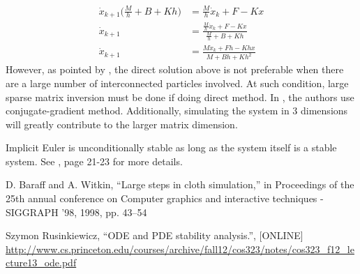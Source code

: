 \documentclass[english, 11pt]{article}
\begin{document}
\begin{equation}
  \begin{split}
    \dot{x}_{k+1} \bigg( \frac{M}{h}+B+Kh \bigg) &= \frac{M}{h}\dot{x}_{k}+F-Kx \\
    \dot{x}_{k+1} &= \frac{\frac{M}{h}\dot{x}_{k}+F-Kx }{\frac{M}{h}+B+Kh} \\
    \dot{x}_{k+1} &= \frac{M\dot{x}_{k}+Fh-Khx}{M+Bh+Kh^2}
  \end{split}  
\end{equation}	
However, as pointed by \cite{Baraff}, the direct solution above is not preferable when there are a large number of interconnected particles involved. At such condition, large sparse matrix inversion must be done if doing direct method. In \cite{Baraff}, the authors use conjugate-gradient method. Additionally, simulating the system in 3 dimensions will greatly contribute to the larger matrix dimension.

Implicit Euler is unconditionally stable as long as the system itself is a stable system. See \cite{Rusinkiewicz}, page 21-23 for more details.


\begin{thebibliography}{9}
D. Baraff and A. Witkin, “Large steps in cloth simulation,” in Proceedings of the 25th annual conference on Computer graphics and interactive techniques - SIGGRAPH ’98, 1998, pp. 43–54 

Szymon Rusinkiewicz, “ODE and PDE stability analysis.”, [ONLINE] \url{http://www.cs.princeton.edu/courses/archive/fall12/cos323/notes/cos323\_f12\_lecture13\_ode.pdf}
\end{thebibliography}


\newpage
\end{document}
